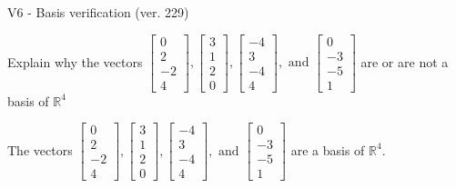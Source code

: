 \begin{exercise}
  \begin{exerciseTitle}V6 - Basis verification (ver. 229)\end{exerciseTitle}
  \begin{exerciseStatement}
    Explain why the vectors \(\left[\begin{array}{r}
0 \\
2 \\
-2 \\
4
\end{array}\right] , \left[\begin{array}{r}
3 \\
1 \\
2 \\
0
\end{array}\right] , \left[\begin{array}{r}
-4 \\
3 \\
-4 \\
4
\end{array}\right] , \text{ and } \left[\begin{array}{r}
0 \\
-3 \\
-5 \\
1
\end{array}\right]\) are or are not a basis of \(\mathbb{R}^4\)	


  \end{exerciseStatement}
  \begin{exerciseAnswer}
   The vectors \(\left[\begin{array}{r}
0 \\
2 \\
-2 \\
4
\end{array}\right] , \left[\begin{array}{r}
3 \\
1 \\
2 \\
0
\end{array}\right] , \left[\begin{array}{r}
-4 \\
3 \\
-4 \\
4
\end{array}\right] , \text{ and } \left[\begin{array}{r}
0 \\
-3 \\
-5 \\
1
\end{array}\right]\) 
  	 are  a basis of \(\mathbb{R}^4\).
  


  \end{exerciseAnswer}
\end{exercise}